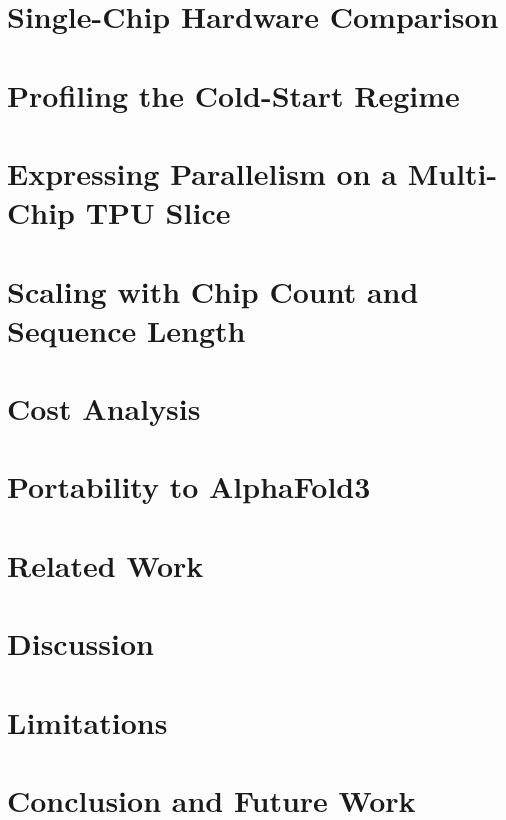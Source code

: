 \documentclass{article}
\begin{document}
\section{Single-Chip Hardware Comparison}\label{sec:results-hardware}


\section{Profiling the Cold-Start Regime}\label{sec:profiling}


\section{Expressing Parallelism on a Multi-Chip TPU Slice}\label{sec:parallelism}


\section{Scaling with Chip Count and Sequence Length}\label{sec:scaling}


\section{Cost Analysis}\label{sec:cost}


\section{Portability to AlphaFold3}\label{sec:alphafold3}


\section{Related Work}\label{sec:related-work}


\section{Discussion}\label{sec:discussion}


\section{Limitations}\label{sec:limitations}


\section{Conclusion and Future Work}\label{sec:conclusion}

\end{document}
